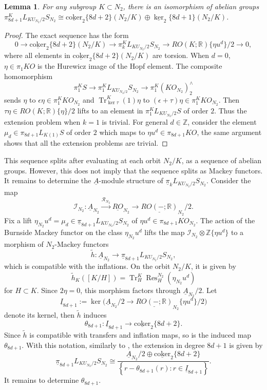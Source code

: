\documentclass{amsart}
\theoremstyle{plain}
\newtheorem{lemma}[theorem]{Lemma}
\theoremstyle{definition}
\theoremstyle{remark}
\begin{document}
\begin{lemma}\label{lem: group structure}
    For any subgroup $K\subset N_2$, there is an isomorphism of abelian groups $\pi_{8d+1}^K L_{KU_{N_2}/2}S_{N_2} \cong \underline{\mathrm{coker}}_2\{8d+2\}(N_2/K) \oplus \underline{\ker}_2\{8d+1\}(N_2/K)$.
\end{lemma}
\begin{proof}
    The exact sequence has the form
    \[0\to  \underline{\mathrm{coker}}_2\{8d+2\}(N_2/K) \to \pi_k^K L_{KU_{N_2}/2}S_{N_2} \to RO(K;\mathbb{R})\{\eta u^d\}/2\to 0,\]
    where all elements in $\underline{\mathrm{coker}}_2\{8d+2\}(N_2/K)$ are torsion. When $d=0$, $\eta\in \pi_1 KO$ is the Hurewicz image of the Hopf element. The composite homomorphism
    \[
        \pi_1^K S  \to \pi_1^K L_{KU_{N_2/2}}S_{N_2} \to \pi_1^K (KO_{N_2})_2^\wedge
    \]
    sends $\eta$ to $ \epsilon\eta\in \pi_1^K KO_{N_2}$ and $\operatorname{Tr}_{\ker \tau}^K(1) \eta$ to $(\epsilon+\tau)\eta \in\pi_1^K KO_{N_2}$.
    Then $\tau\eta\in RO(K;\mathbb{R})\{\eta\}/2$ lifts to an element in $\pi_1^K L_{KU_{N_2}/2}S$ of order $2$. Thus the extension problem when $k=1$ is trivial. For general $d\in \mathbb{Z}$, consider the element $\mu_d\in \pi_{8d+1}L_{K(1)}S$ of order $2$ which maps to $\eta u^d \in \pi_{8d+1} KO$, the same argument shows that all the extension problems are trivial.
\end{proof}

This sequence splits after evaluating at each orbit $N_2/K$, as a sequence
of abelian groups. However, this does not imply that the sequence splits as Mackey functors. It remains to determine the $\underline{A}$-module structure of $\underline{\pi}_k L_{KU_{N_2}/2}S_{N_2}$. Consider the map
\[
\mathcal{I}_{N_2}:\underline A_{N_2} \overset{\mathcal{R}_{N_2}}{\longrightarrow} \underline{RO}_{N_2}\longrightarrow \underline{RO(-;\mathbb R)}_{N_2}/2.
\]
Fix a lift $\eta_{N_2} u^d =\mu_d \in \underline{\pi}_{8d+1} L_{KU_{N_2}/2}S_{N_2}$ of $\eta u^d\in \pi_{8d+1}KO_{N_2}$. The action of the Burnside Mackey functor on the class $\eta_{N_2} u^d$ lifts the map $\mathcal{I}_{N_2}\otimes \mathbb{Z}\{\eta u^d\}$ to a morphism of $N_2$-Mackey functors
\[
\widetilde h:\underline A_{N_2}\longrightarrow \underline{\pi}_{8d+1} L_{KU_{N_2}/2}S_{N_2},
\]
which is compatible with the inflations. On the orbit $N_2/K$, it is given by
\[
\widetilde h_K([K/H]) = \operatorname{Tr}_H^K\operatorname{Res}_H^{N_2}(\eta_{N_2}u^d)
\]
for $H\subset K$. Since $2\eta=0$, this morphism factors through $\underline A_{N_2}/2$. Let
\[
\underline{I}_{8d+1}:=\ker\big(\underline A_{N_2}/2
\to
\underline{RO(-;\mathbb R)}_{N_2}\{\eta u^d\}/2\big)
\]
denote its kernel, then $\widetilde{h}$ induces
\[
\theta_{8d+1}:
\underline{I}_{8d+1}
\longrightarrow
\underline{\mathrm{coker}}_2\{8d+2\}.
\]
Since $\widetilde h$ is compatible with transfers and inflation maps, so is the induced map $\theta_{8d+1}$.
With this notation, similarly to , the extension in degree $8d+1$ is given by
\[
\underline{\pi}_{8d+1}L_{KU_{N_2}/2}S_{N_2}
\cong
\frac{
\underline A_{N_2}/2\oplus \underline{\mathrm{coker}}_2\{8d+2\}
}{
\left\{
r-\theta_{8d+1}(r):
r\in \underline{I}_{8d+1}
\right\}
}.
\]
It remains to determine $\theta_{8d+1}$.
\end{document}
